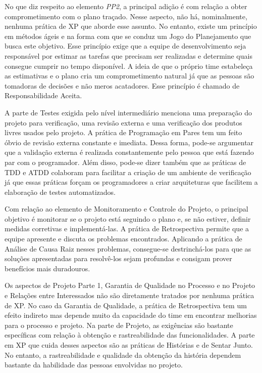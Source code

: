 No que diz respeito ao elemento \textit{PP2}, a principal adição é com
relação a obter comprometimento com o plano traçado. Nesse aspecto,
não há, nominalmente, nenhuma prática de XP que aborde esse
assunto. No entanto, existe um princípio em métodos ágeis e na forma
com que se conduz um Jogo do Planejamento que busca este
objetivo. Esse princípio exige que a equipe de desenvolvimento seja
responsável por estimar as tarefas que precisam ser realizadas e
determine quais consegue cumprir no tempo disponível. A ideia de que o
próprio time estabeleça as estimativas e o plano cria um
comprometimento natural já que as pessoas são tomadoras de decisões e
não meros acatadores. Esse princípio é chamado de Responsabilidade
Aceita.

A parte de Testes exigida pelo nível intermediário menciona uma
preparação do projeto para verificação, uma revisão externa e uma
verificação dos produtos livres usados pelo projeto. A prática de
Programação em Pares tem um feito óbvio de revisão externa constante e
imediata. Dessa forma, pode-se argumentar que a validação externa é
realizada constantemente pelo pessoa que está fazendo par com o
programador. Além disso, pode-se dizer também que as práticas de TDD e
ATDD colaboram para facilitar a criação de um ambiente de verificação
já que essas práticas forçam os programadores a criar arquiteturas que
facilitem a elaboração de testes automatizados.

Com relação ao elemento de Monitoramento e Controle do Projeto, o
principal objetivo é monitorar se o projeto está seguindo o plano e,
se não estiver, definir medidas corretivas e implementá-las. A prática
de Retrospectiva permite que a equipe apresente e discuta os problemas
encontrados. Aplicando a prática de Análise de Causa Raiz nesses
problemas, consegue-se destrinchá-los para que as soluções
apresentadas para resolvê-los sejam profundas e consigam prover
benefícios mais duradouros.

Os aspectos de Projeto Parte 1, Garantia de Qualidade no Processo e no
Projeto e Relações entre Interessados não são diretamente tratados por
nenhuma prática de XP. No caso da Garantia de Qualidade, a prática de
Retrospectiva tem um efeito indireto mas depende muito da capacidade
do time em encontrar melhorias para o processo e projeto. Na parte de
Projeto, as exigências são bastante específicas com relação à obtenção
e rastreabilidade das funcionalidades. A parte em XP que cuida desses
aspectos são as práticas de Histórias e de Sentar Junto. No entanto, a
rastreabilidade e qualidade da obtenção da história dependem bastante
da habilidade das pessoas envolvidas no projeto.

